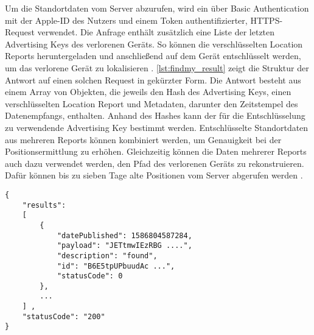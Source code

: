 Um die Standortdaten vom Server abzurufen, wird ein über Basic Authentication mit der Apple-ID des Nutzers und einem Token authentifizierter, HTTPS-Request verwendet.
Die Anfrage enthält zusätzlich eine Liste der letzten Advertising Keys des verlorenen Geräts.
So können die verschlüsselten Location Reports heruntergeladen und anschließend auf dem Gerät entschlüsselt werden, um das verlorene Gerät zu lokalisieren \cite{Heinrich_FindMy}.
\autoref{lst:findmy_result} zeigt die Struktur der Antwort auf einen solchen Request in gekürzter Form.
Die Antwort besteht aus einem Array von Objekten, die jeweils den Hash des Advertising Keys, einen verschlüsselten Location Report und Metadaten, darunter den Zeitstempel des Datenempfangs, enthalten.
Anhand des Hashes kann der für die Entschlüsselung zu verwendende Advertising Key bestimmt werden.
Entschlüsselte Standortdaten aus mehreren Reports können kombiniert werden, um Genauigkeit bei der Positionsermittlung zu erhöhen.
Gleichzeitig können die Daten mehrerer Reports auch dazu verwendet werden, den Pfad des verlorenen Geräts zu rekonstruieren.
Dafür können bis zu sieben Tage alte Positionen vom Server abgerufen werden \cite{Heinrich_FindMy}.

\begin{lstlisting}[label=lst:findmy_result,caption={Beispielhafte Antwort beim herunterladen von Location Reports\cite{Heinrich_FindMy}.}]
{
    "results": 
    [
        {
            "datePublished": 1586804587284,
            "payload": "JETtmwIEzRBG ....",
            "description": "found",
            "id": "B6E5tpUPbuudAc ...",
            "statusCode": 0
        },
        ...
    ] ,
    "statusCode": "200"
}
\end{lstlisting}